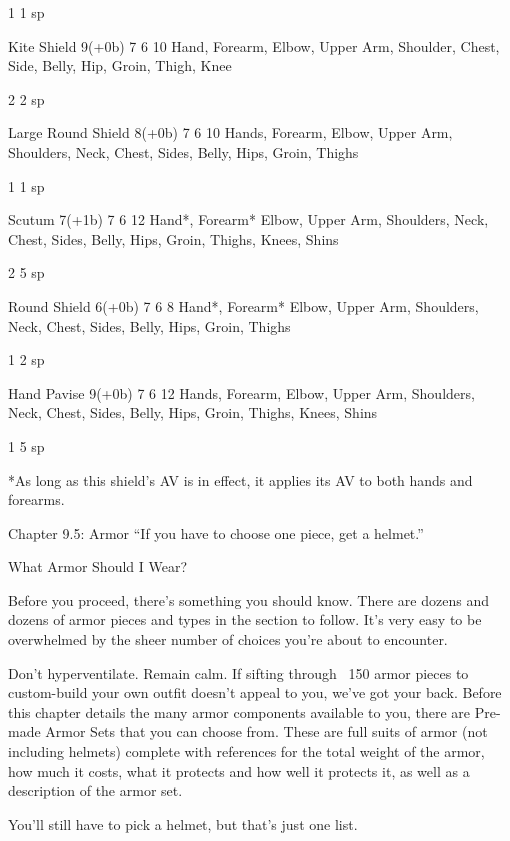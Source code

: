 \documentclass[oneside,11pt,english]{book}
\begin{document}
1 1 sp 

Kite Shield 9(+0b) 7 6 10 Hand, Forearm, Elbow, Upper Arm, Shoulder, Chest, 
Side, Belly, Hip, Groin, Thigh, Knee 

2 2 sp 

Large Round Shield 8(+0b) 7 6 10 Hands, Forearm, Elbow, Upper Arm, Shoulders, Neck, 
Chest, Sides, Belly, Hips, Groin, Thighs 

1 1 sp 

Scutum 7(+1b) 7 6 12 Hand*, Forearm* Elbow, Upper Arm, Shoulders, 
Neck, Chest, Sides, Belly, Hips, Groin, Thighs, Knees, 
Shins 

2 5 sp 

Round Shield 6(+0b) 7 6 8 Hand*, Forearm* Elbow, Upper Arm, Shoulders, 
Neck, Chest, Sides, Belly, Hips, Groin, Thighs 

1 2 sp 

Hand Pavise 9(+0b) 7 6 12 Hands, Forearm, Elbow, Upper Arm, Shoulders, Neck, 
Chest, Sides, Belly, Hips, Groin, Thighs, Knees, Shins 

1 5 sp 

*As long as this shield’s AV is in effect, it applies its AV to both hands and forearms. 

 

Chapter 9.5: Armor 
“If you have to choose one piece, get a helmet.” 

 

What Armor Should I Wear? 

 

Before you proceed, there’s something you should know. There are dozens and dozens of armor pieces 
and types in the section to follow. It’s very easy to be overwhelmed by the sheer number of choices 
you’re about to encounter. 

 

Don’t hyperventilate. Remain calm. If sifting through ~150 armor pieces to custom-build your own outfit 
doesn’t appeal to you, we’ve got your back. Before this chapter details the many armor components 
available to you, there are Pre-made Armor Sets that you can choose from. These are full suits of armor 
(not including helmets) complete with references for the total weight of the armor, how much it costs, 
what it protects and how well it protects it, as well as a description of the armor set. 

 


You’ll still have to pick a helmet, but that’s just one list. 

 
\end{document}
